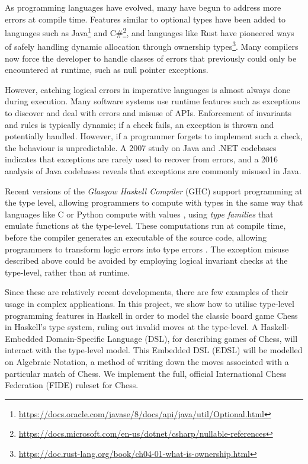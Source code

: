 \documentclass[12pt, a4paper, bibliography=totocnumbered]{scrreprt}
\begin{document}
As programming languages have evolved, many have begun to address more errors at compile time. Features similar to optional types have been added to languages such as Java\footnote{\url{https://docs.oracle.com/javase/8/docs/api/java/util/Optional.html}} and C\#\footnote{\url{https://docs.microsoft.com/en-us/dotnet/csharp/nullable-references}}, and languages like Rust have pioneered ways of safely handling dynamic allocation through ownership types\footnote{\url{https://doc.rust-lang.org/book/ch04-01-what-is-ownership.html}}. Many compilers now force the developer to handle classes of errors that previously could only be encountered at runtime, such as null pointer exceptions.

However, catching logical errors in imperative languages is almost always done during execution. Many software systems use runtime features such as exceptions to discover and deal with errors and misuse of APIs. Enforcement of invariants and rules is typically dynamic; if a check fails, an exception is thrown and potentially handled. However, if a programmer forgets to implement such a check, the behaviour is unpredictable. A 2007 study \cite{exceptionsusedpoorly} on Java and .NET codebases indicates that exceptions are rarely used to recover from errors, and a 2016 analysis of Java codebases \cite{badjavaexceptions} reveals that exceptions are commonly misused in Java.

Recent versions of the \emph{Glasgow Haskell Compiler} (GHC) support programming at the type level, allowing programmers to compute with types in the same way that languages like C or Python compute with values \cite{yorgey2012giving}, using \emph{type families} \cite{opentfs} \cite{closedtfs} that emulate functions at the type-level. These computations run at compile time, before the compiler generates an executable of the source code, allowing programmers to transform logic errors into type errors \cite{twt}. The exception misuse described above could be avoided by employing logical invariant checks at the type-level, rather than at runtime.

Since these are relatively recent developments, there are few examples of their usage in complex applications. In this project, we show how to utilise type-level programming features in Haskell in order to model the classic board game Chess in Haskell's type system, ruling out invalid moves at the type-level. A Haskell-Embedded Domain-Specific Language (DSL), for describing games of Chess, will interact with the type-level model. This Embedded DSL (EDSL) will be modelled on Algebraic Notation, a method of writing down the moves associated with a particular match of Chess. We implement the full, official International Chess Federation (FIDE) ruleset for Chess.
\end{document}
